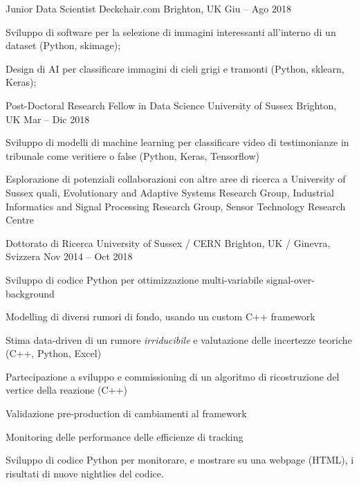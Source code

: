 \begin{cventries}
    \cventry
    {Junior Data Scientist}
    {Deckchair.com}
    {Brighton, UK}
    {Giu -- Ago 2018}
    {
      \begin{cvitems}
        \item Sviluppo di software per la selezione di immagini interessanti all'interno di un dataset (Python, skimage);
        \item Design di AI per classificare immagini di cieli grigi e tramonti (Python, sklearn, Keras);
      \end{cvitems}
    }
  \end{cventries}


  \begin{cventries}
    \cventry
    {Post-Doctoral Research Fellow in Data Science}
    {University of Sussex}
    {Brighton, UK}
    {Mar -- Dic 2018}
    {
      \begin{cvitems}
        \item Sviluppo di modelli di machine learning per classificare video di testimonianze in tribunale come veritiere o false (Python, Keras, Tensorflow)
        \item Esplorazione di potenziali collaborazioni con altre aree di ricerca a University of Sussex quali, Evolutionary and Adaptive Systems Research Group, Industrial Informatics and Signal Processing Research Group, Sensor Technology Research Centre
      \end{cvitems}
    }
  \end{cventries}

  \begin{cventries}
    \cventry
    {Dottorato di Ricerca}
    {University of Sussex / CERN}
    {Brighton, UK / Ginevra, Svizzera}
    {Nov 2014 -- Oct 2018}
    {
    \begin{cvitems}
      \item Sviluppo di codice Python per ottimizzazione multi-variabile signal-over-background
      \item Modelling di diversi rumori di fondo, usando un custom C++ framework
      \item Stima data-driven di un rumore \emph{irriducibile} e valutazione delle incertezze teoriche (C++, Python, Excel)
      \item Partecipazione a sviluppo e commissioning di un algoritmo di ricostruzione del vertice della reazione (C++)
      \item Validazione pre-production di cambiamenti al framework
      \item Monitoring delle performance delle efficienze di tracking
      \item Sviluppo di codice Python per monitorare, e mostrare su una webpage (HTML), i risultati di nuove nightlies del codice.
    \end{cvitems}
    }
  \end{cventries}

